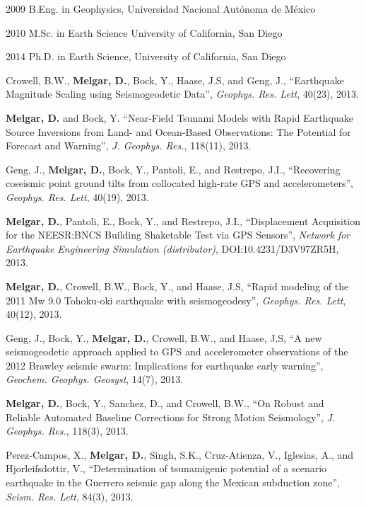 \begin{frontmatter}
%
%
\begin{vitapage}
\begin{vita}
  \item[2009] B.Eng. in Geophysics, Universidad Nacional Aut\'onoma de M\'exico
  \item[2010] M.Sc. in Earth Science University of California, San Diego
  \item[2014] Ph.D. in Earth Science, University of California, San Diego 
\end{vita}
\begin{publications}
\item Crowell, B.W., \textbf{Melgar, D.}, Bock, Y., Haase, J.S, and Geng, J., ``Earthquake Magnitude Scaling using Seismogeodetic Data'', \emph{Geophys. Res. Lett}, 40(23), 2013.
\item \textbf{Melgar, D.} and Bock, Y. ``Near-Field Tsunami Models with Rapid Earthquake Source Inversions from Land- and Ocean-Based Observations: The Potential for Forecast and Warning'', \emph{J. Geophys. Res.}, 118(11), 2013.
\item Geng, J., \textbf{Melgar, D.}, Bock, Y., Pantoli, E., and Restrepo, J.I., ``Recovering coseismic point ground tilts from collocated high-rate GPS and accelerometers'', \emph{Geophys. Res. Lett}, 40(19), 2013.
\item \textbf{Melgar, D.}, Pantoli, E., Bock, Y., and Restrepo, J.I., ``Displacement Acquisition for the NEESR:BNCS Building Shaketable Test via GPS Sensors'', \emph{Network for Earthquake Engineering Simulation (distributor)}, DOI:10.4231/D3V97ZR5H, 2013.
\item \textbf{Melgar, D.}, Crowell, B.W., Bock, Y., and Haase, J.S, ``Rapid modeling of the 2011 Mw 9.0 Tohoku-oki earthquake with seismogeodesy'', \emph{Geophys. Res. Lett}, 40(12), 2013.
\item Geng, J., Bock, Y., \textbf{Melgar, D.}, Crowell, B.W., and Haase, J.S, ``A new seismogeodetic approach applied to GPS and accelerometer observations of the 2012 Brawley seismic swarm: Implications for earthquake early warning'', \emph{Geochem. Geophys. Geosyst}, 14(7), 2013.
\item \textbf{Melgar, D.}, Bock, Y., Sanchez, D., and Crowell, B.W., ``On Robust and Reliable Automated Baseline Corrections for Strong Motion Seismology'', \emph{J. Geophys. Res.}, 118(3), 2013.
\item Perez-Campos, X., \textbf{Melgar, D.}, Singh, S.K., Cruz-Atienza, V., Iglesias, A., and Hjorleifsdottir, V., ``Determination of tsunamigenic potential of a scenario earthquake in the Guerrero seismic gap along the Mexican subduction zone'', \emph{Seism. Res. Lett}, 84(3), 2013.

\end{publications}
\end{vitapage}
\end{frontmatter}
